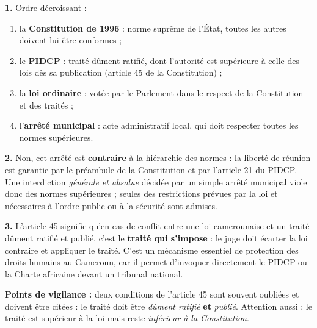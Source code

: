 \documentclass[11pt]{article}
\begin{document}
\begin{corrige}
\textbf{1.} Ordre décroissant :
\begin{enumerate}
\item la \textbf{Constitution de 1996} : norme suprême de l'État, toutes les autres doivent lui être conformes ;
\item le \textbf{PIDCP} : traité dûment ratifié, dont l'autorité est supérieure à celle des lois dès sa publication (article 45 de la Constitution) ;
\item la \textbf{loi ordinaire} : votée par le Parlement dans le respect de la Constitution et des traités ;
\item l'\textbf{arrêté municipal} : acte administratif local, qui doit respecter toutes les normes supérieures.
\end{enumerate}

\textbf{2.} Non, cet arrêté est \textbf{contraire} à la hiérarchie des normes : la liberté de réunion est garantie par le préambule de la Constitution et par l'article 21 du PIDCP. Une interdiction \emph{générale et absolue} décidée par un simple arrêté municipal viole donc des normes supérieures ; seules des restrictions prévues par la loi et nécessaires à l'ordre public ou à la sécurité sont admises.

\textbf{3.} L'article 45 signifie qu'en cas de conflit entre une loi camerounaise et un traité dûment ratifié et publié, c'est le \textbf{traité qui s'impose} : le juge doit écarter la loi contraire et appliquer le traité. C'est un mécanisme essentiel de protection des droits humains au Cameroun, car il permet d'invoquer directement le PIDCP ou la Charte africaine devant un tribunal national.

\textbf{Points de vigilance :} deux conditions de l'article 45 sont souvent oubliées et doivent être citées : le traité doit être \emph{dûment ratifié} \textbf{et} \emph{publié}. Attention aussi : le traité est supérieur à la loi mais reste \emph{inférieur à la Constitution}.
\end{corrige}
\end{document}
